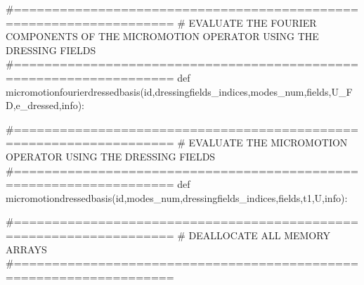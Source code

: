 \documentclass[10pt,a4paper]{article}
\begin{document}
#===================================================================
#  EVALUATE THE FOURIER COMPONENTS OF THE MICROMOTION OPERATOR USING THE DRESSING FIELDS
#===================================================================
def micromotionfourierdressedbasis(id,dressingfields_indices,modes_num,fields,U_FD,e_dressed,info):



#===================================================================
#  EVALUATE THE MICROMOTION OPERATOR USING THE DRESSING FIELDS
#===================================================================
def micromotiondressedbasis(id,modes_num,dressingfields_indices,fields,t1,U,info):

#===================================================================
#  DEALLOCATE ALL MEMORY ARRAYS
#===================================================================






\end{document}
